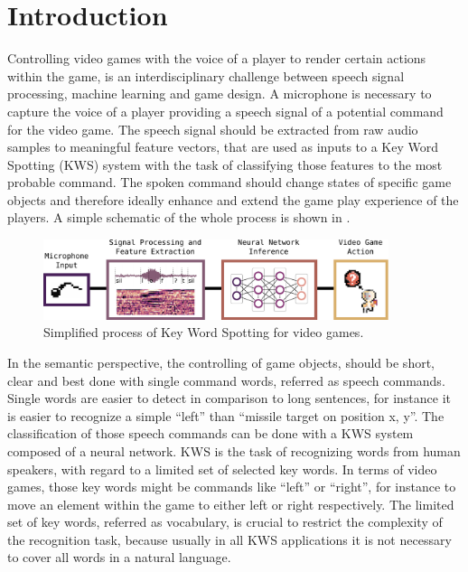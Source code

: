 
\chapter{Introduction}\label{sec:intro}
\thesisStateRevised
Controlling video games with the voice of a player to render certain actions within the game, is an interdisciplinary challenge between speech signal processing, machine learning and game design.
A microphone is necessary to capture the voice of a player providing a speech signal of a potential command for the video game.
The speech signal should be extracted from raw audio samples to meaningful feature vectors, that are used as inputs to a Key Word Spotting (KWS) system with the task of classifying those features to the most probable command.
The spoken command should change states of specific game objects and therefore ideally enhance and extend the game play experience of the players.
A simple schematic of the whole process is shown in .
\begin{figure}[!ht]
  \centering
    \includegraphics[width=0.9\textwidth]{./1_intro/figs/intro_kws}
  \caption{Simplified process of Key Word Spotting for video games.}
  \label{fig:intro_kws}
\end{figure}
\FloatBarrier
\noindent
In the semantic perspective, the controlling of game objects, should be short, clear and best done with single command words, referred as speech commands.
Single words are easier to detect in comparison to long sentences, for instance it is easier to recognize a simple \enquote{left} than \enquote{missile target on position x, y}.
The classification of those speech commands can be done with a KWS system composed of a neural network.
KWS is the task of recognizing words from human speakers, with regard to a limited set of selected key words.
In terms of video games, those key words might be commands like \enquote{left} or \enquote{right}, for instance to move an element within the game to either left or right respectively.
The limited set of key words, referred as vocabulary, is crucial to restrict the complexity of the recognition task, because usually in all KWS applications it is not necessary to cover all words in a natural language.
